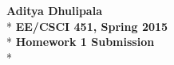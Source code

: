 \documentclass{article}
\begin{document}
\thispagestyle{empty}
\date{}




\Large
\begin{center}
	\textbf{Aditya Dhulipala}
	\\*
	\textbf{EE/CSCI 451, Spring 2015 }
	\\*
	\textbf{Homework 1 Submission}
	\\*
\end{center}

\normalsize

\begin{enumerate}[label=\Large\textbf{\arabic*}.]



\end{enumerate}
\end{document}
